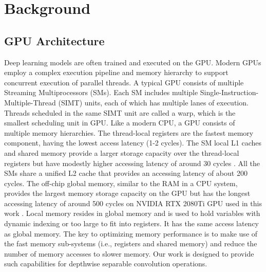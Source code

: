 
\section{Background}







\subsection{GPU Architecture}
Deep learning models are often trained and executed on the GPU. Modern GPUs employ a complex execution pipeline and memory hierarchy to
support concurrent execution of parallel threads. A typical GPU consists of multiple Streaming Multiprocessors (SMs). Each SM includes
multiple Single-Instruction-Multiple-Thread (SIMT) units, each of which has multiple lanes of execution. Threads scheduled in the same SIMT
unit are called a warp, which is the smallest scheduling unit in GPU. Like a modern CPU, a GPU consists of multiple memory hierarchies. The
thread-local registers are the fastest memory component, having the lowest access latency (1-2 cycles). The SM local L1 caches and shared
memory provide a larger storage capacity over the thread-local registers but have modestly higher accessing latency of around 30 cycles
\cite{mei2016dissecting,jia2018dissecting}. All the SMs share a unified L2 cache that provides an accessing latency of about 200 cycles.
The off-chip global memory, similar to the RAM in a CPU system, provides the largest memory storage capacity on the GPU but has the longest
accessing latency of around 500 cycles on NVIDIA RTX 2080Ti GPU used in this work . Local memory
resides in global memory and is used to hold variables with dynamic indexing or too large to fit into registers. It has the same access
latency as global memory. The key to optimizing memory performance is to make use of the fast memory sub-systems (i.e., registers and
shared memory) and reduce the number of memory accesses to slower memory. Our work is designed to provide such capabilities for depthwise
separable convolution operations.


